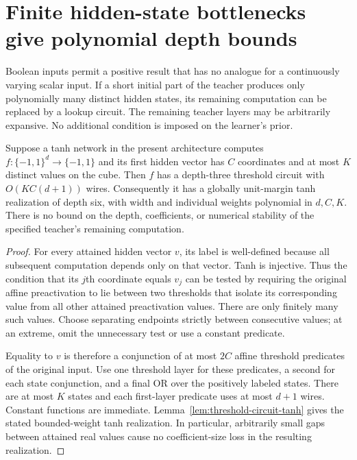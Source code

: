 \section{Finite hidden-state bottlenecks give polynomial depth bounds}
\label{sec:finite-state-bottleneck}

Boolean inputs permit a positive result that has no analogue for a
continuously varying scalar input. If a short initial part of the teacher
produces only polynomially many distinct hidden states, its remaining
computation can be replaced by a lookup circuit. The remaining teacher
layers may be arbitrarily expansive. No additional condition is imposed
on the learner's prior.

\begin{proposition}
\label{prop:first-layer-finite-state}
Suppose a tanh network in the present architecture computes
$f:\{-1,1\}^d\to\{-1,1\}$ and its first hidden vector has $C$
coordinates and at most $K$ distinct values on the cube. Then $f$ has a
depth-three threshold circuit with $O(KC(d+1))$ wires. Consequently it
has a globally unit-margin tanh realization of depth six, with width
and individual weights polynomial in $d,C,K$.
There is no bound on the depth, coefficients, or numerical stability
of the specified teacher's remaining computation.
\end{proposition}

\begin{proof}
For every attained hidden vector $v$, its label is well-defined because
all subsequent computation depends only on that vector. Tanh is
injective. Thus the condition that its $j$th coordinate equals $v_j$
can be tested by requiring the original affine preactivation to lie
between two thresholds that isolate its corresponding value from all
other attained preactivation values. There are only finitely many such
values. Choose separating endpoints strictly between consecutive values;
at an extreme, omit the unnecessary test or use a constant predicate.

Equality to $v$ is therefore a conjunction of at most $2C$ affine
threshold predicates of the original input. Use one threshold layer for
these predicates, a second for each state conjunction, and a final OR
over the positively labeled states. There are at most $K$ states and
each first-layer predicate uses at most $d+1$ wires. Constant functions
are immediate. Lemma~\ref{lem:threshold-circuit-tanh} gives the stated
bounded-weight tanh realization. In particular, arbitrarily small gaps
between attained real values cause no coefficient-size loss in the
resulting realization.
\end{proof}

